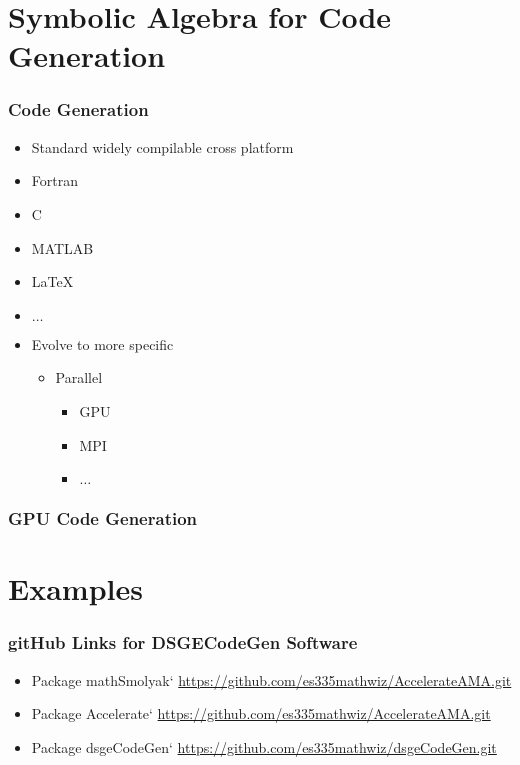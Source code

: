 \documentclass{beamer}
\begin{document}
\section{Symbolic Algebra for Code Generation}

\begin{frame}
  \frametitle{ Code Generation}
  


\begin{itemize}
\item Standard widely compilable cross platform
\item Fortran
\item C
\item MATLAB
\item \LaTeX
\item $\ldots$
\item Evolve to more specific
  \begin{itemize}
  \item Parallel
    \begin{itemize}
  \item GPU
  \item MPI
  \item $\ldots$
    \end{itemize}
  \end{itemize}
\end{itemize}

\end{frame}




\begin{frame}
  \frametitle{GPU Code Generation}
  
\end{frame}


\section{Examples}


\begin{frame}
  \frametitle{gitHub Links for DSGECodeGen Software}
  

  \begin{itemize}
  \item Package mathSmolyak` \href{https://github.com/es335mathwiz/AccelerateAMA.git}{https://github.com/es335mathwiz/AccelerateAMA.git}
  \item Package Accelerate` \href{https://github.com/es335mathwiz/AccelerateAMA.git}{https://github.com/es335mathwiz/AccelerateAMA.git}
  \item Package dsgeCodeGen` \href{https://github.com/es335mathwiz/dsgeCodeGen.git}{https://github.com/es335mathwiz/dsgeCodeGen.git}
\end{itemize}

\end{frame}
\end{document}
